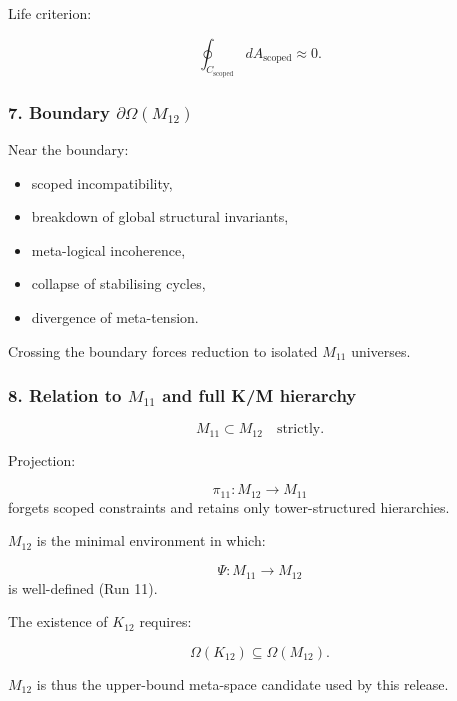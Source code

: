 Life criterion:

\[
\oint_{C_{\mathrm{scoped}}} dA_{\mathrm{scoped}} \approx 0.
\]

\subsubsection*{7. Boundary $\partial\Omega(M_{12})$}

Near the boundary:

\begin{itemize}
    \item scoped incompatibility,
    \item breakdown of global structural invariants,
    \item meta-logical incoherence,
    \item collapse of stabilising cycles,
    \item divergence of meta-tension.
\end{itemize}

Crossing the boundary forces reduction to isolated $M_{11}$ universes.

\subsubsection*{8. Relation to $M_{11}$ and full K/M hierarchy}

\[
M_{11} \subset M_{12}
\quad\text{strictly}.
\]

Projection:

\[
\pi_{11}: M_{12} \to M_{11}
\]
forgets scoped constraints and retains only tower-structured hierarchies.

$M_{12}$ is the minimal environment in which:

\[
\Psi: M_{11} \to M_{12}
\]
is well-defined (Run 11).

The existence of $K_{12}$ requires:

\[
\Omega(K_{12}) \subseteq \Omega(M_{12}).
\]

$M_{12}$ is thus the upper-bound meta-space candidate used by this release.
